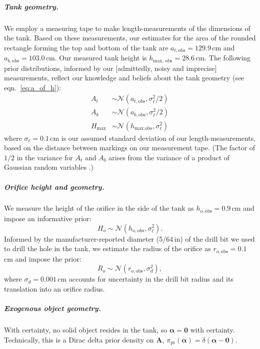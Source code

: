 \documentclass[openacc]{rsproca_new}%
\begin{document}
\vspace{-\baselineskip}
\subparagraph{Tank geometry.} We employ a measuring tape to make length-measurements of the dimensions of the tank.
Based on these measurements, our estimates for the area of the rounded rectangle forming the top and bottom of the tank are $a_{t, \text{obs}}=129.9$\,cm and $a_{b, \text{obs}}=103.0$\,cm. Our measured tank height is $h_{\text{max, obs}}=28.6$\,cm.
The following prior distributions, informed by our [admittedly, noisy and imprecise] measurements, reflect our knowledge and beliefs about the tank geometry (see eqn.~\ref{eq:a_of_h}):
\begin{align}
A_t &\sim \mathcal{N}(a_{t, \text{obs}}, \sigma_\ell^2/2) \label{eq:A_t_prior} \\
A_b &\sim \mathcal{N}(a_{b, \text{obs}}, \sigma_\ell^2/2) \\
H_{\text{max}} &\sim \mathcal{N}(h_{\text{max}, \text{obs}}, \sigma_\ell^2)
\end{align}
where $\sigma_\ell=0.1$\,cm is our assumed standard deviation of our length-measurements, based on the distance between markings on our measurement tape. 
(The factor of $1/2$ in the variance for $A_t$ and $A_b$ arises from the variance of a product of Gaussian random variables \cite{bromiley2003products}.)

\vspace{-\baselineskip}
\subparagraph{Orifice height and geometry.} 
We measure the height of the orifice in the side of the tank as $h_{o, \text{obs}}=0.9$\,cm and impose an informative prior:
\begin{equation}
H_o \sim \mathcal{N}(h_{o, \text{obs}}, \sigma_\ell^2).
\end{equation}
Informed by the manufacturer-reported diameter (5/64\,in) of the drill bit we used to drill the hole in the tank, we estimate the radius of the orifice as $r_{o, \text{obs}}=0.1$\,cm and impose the prior:
\begin{equation}
R_o \sim \mathcal{N}(r_{o, \text{obs}}, \sigma_d^2), \label{eq:R_o_prior}
\end{equation}
where $\sigma_d= 0.001$\,cm accounts for uncertainty in the drill bit radius and its translation into an orifice radius.

\vspace{-\baselineskip}
\subparagraph{Exogenous object geometry.}
With certainty, no solid object resides in the tank, so $\boldsymbol \alpha=\mathbf{0}$ with certainty. Technically, this is a Dirac delta prior density on $\mathbf{A}$, $\pi_{\text{pr}}(\boldsymbol \alpha)=\delta(\boldsymbol \alpha - \mathbf{0})$. 
\end{document}
